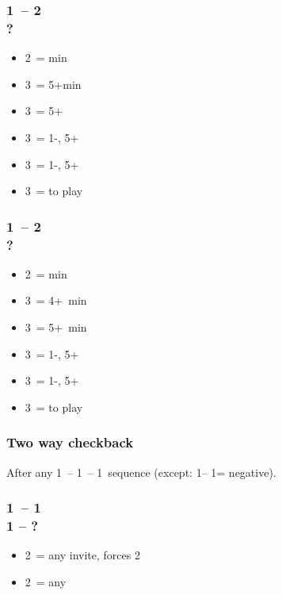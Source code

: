 \documentclass[12pt, a4paper]{article}
\begin{document}
\subsubsection*{1\clubs\ -- 2\spades \\ ?}
\begin{itemize}
    \item 2\nt\ = \bal min
    \item 3\clubs\ = 5+\clubs min
    \item 3\diams\ = 5+\clubs \gf
    \item 3\hearts\ = 1-\hearts, 5+\clubs\ \gf
    \item 3\spades\ = 1-\spades, 5+\clubs\ \gf
    \item 3\nt\ = to play
\end{itemize}

\subsubsection*{1\diams\ -- 2\spades \\ ?}
\begin{itemize}
    \item 2\nt\ = \bal min
    \item 3\clubs\ = 4+\clubs\ min
    \item 3\diams\ = 5+\diams\ min
    \item 3\hearts\ = 1-\hearts, 5+\diams\ \gf
    \item 3\spades\ = 1-\spades, 5+\diams\ \gf
    \item 3\nt\ = to play
\end{itemize}

\subsubsection*{Two way checkback}

After any 1\ -- 1\ -- 1\ sequence (except:
1\clubs -- 1\diams = negative).

\subsubsection*{1\ -- 1 \\ 1 -- ?}
\begin{itemize}
    \item 2\clubs\ = any invite, forces 2\diams
    \item 2\diams\ = any \gf
\end{itemize}

\end{document}
